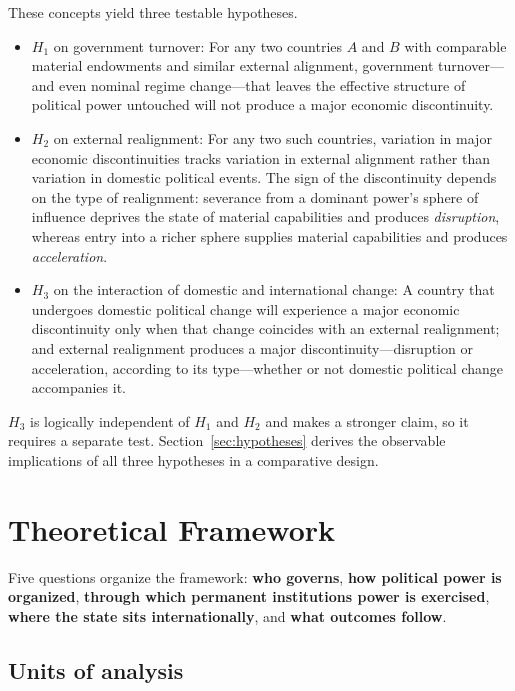 \documentclass[11pt]{article}
\begin{document}
These concepts yield three testable hypotheses.

\begin{itemize}
    \item $H_1$ on government turnover: For any two countries $A$ and $B$ with comparable material endowments and similar external alignment, government turnover---and even nominal regime change---that leaves the effective structure of political power untouched will not produce a major economic discontinuity.
    \item $H_2$ on external realignment: For any two such countries, variation in major economic discontinuities tracks variation in external alignment rather than variation in domestic political events. The sign of the discontinuity depends on the type of realignment: severance from a dominant power's sphere of influence deprives the state of material capabilities and produces \emph{disruption}, whereas entry into a richer sphere supplies material capabilities and produces \emph{acceleration}.
    \item $H_3$ on the interaction of domestic and international change: A country that undergoes domestic political change will experience a major economic discontinuity only when that change coincides with an external realignment; and external realignment produces a major discontinuity---disruption or acceleration, according to its type---whether or not domestic political change accompanies it.
\end{itemize}

$H_3$ is logically independent of $H_1$ and $H_2$ and makes a stronger claim, so it requires a separate test. Section~\ref{sec:hypotheses} derives the observable implications of all three hypotheses in a comparative design.

\section{Theoretical Framework}
\label{sec:framework}

Five questions organize the framework: \textbf{who governs}, \textbf{how political power is organized}, \textbf{through which permanent institutions power is exercised}, \textbf{where the state sits internationally}, and \textbf{what outcomes follow}.

\subsection{Units of analysis}
\end{document}
